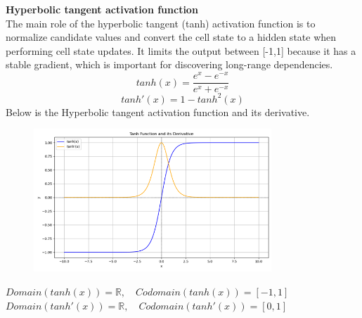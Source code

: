 \documentclass[12pt,a4paper]{article}
\begin{document}
\textbf{Hyperbolic tangent activation function}
\\[1ex]
The main role of the hyperbolic tangent (tanh) activation function is to normalize candidate values and convert the cell state to a hidden state when performing cell state updates. It limits the output between [-1,1] because it has a stable gradient, which is important for discovering long-range dependencies.
\newline
\begin{equation}
    tanh(x) = \frac{ e^{x} - e^{-x} }{e^{x} + e^{-x}}
\end{equation}
\begin{equation}
    tanh'(x) = 1 - tanh^{2}(x)
\end{equation}
Below is the Hyperbolic tangent activation function and its derivative.
\begin{figure}[!htb]
    \centering
    \includegraphics[width=0.8\textwidth]{../Pic/tanh.png} %
\end{figure}

$Domain(tanh(x))=\mathbb{R},\hspace{1em} Codomain(tanh(x))=[-1,1]$\\
$Domain(tanh'(x))=\mathbb{R},\hspace{1em} Codomain(tanh'(x))=[0,1]$

\end{document}
